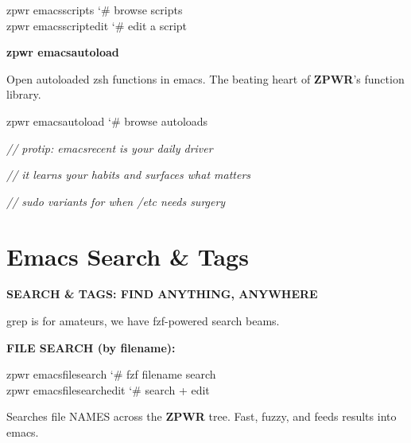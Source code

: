 \documentclass[11pt,a4paper,twoside]{book}
\begin{document}
\begin{codebox}
\color{neongreen}zpwr emacsscripts           {\char`\#} browse scripts\\
\color{neongreen}zpwr emacsscriptedit        {\char`\#} edit a script\\
\end{codebox}


\vspace{12pt}
{\bfseries\color{neonyellow} zpwr emacsautoload}\vspace{4pt}

Open autoloaded zsh functions in emacs. The beating heart of \textbf{ZPWR}'s function library.

\begin{codebox}
\color{neongreen}zpwr emacsautoload          {\char`\#} browse autoloads\\
\end{codebox}

{\small\itshape\color{dimtext} // protip: emacsrecent is your daily driver}

{\small\itshape\color{dimtext} // it learns your habits and surfaces what matters}

{\small\itshape\color{dimtext} // sudo variants for when /etc needs surgery}


\vspace{16pt}

\section{Emacs Search \& Tags}


\vspace{10pt}
{\large\bfseries\color{neoncyan} SEARCH \& TAGS: FIND ANYTHING, ANYWHERE}\vspace{6pt}

grep is for amateurs, we have fzf-powered search beams.


\vspace{12pt}
{\bfseries\color{neonyellow} FILE SEARCH (by filename):}\vspace{4pt}

\begin{codebox}
\color{neongreen}zpwr emacsfilesearch        {\char`\#} fzf filename search\\
\color{neongreen}zpwr emacsfilesearchedit    {\char`\#} search + edit\\
\end{codebox}

Searches file NAMES across the \textbf{ZPWR} tree. Fast, fuzzy, and feeds results into emacs.
\end{document}
